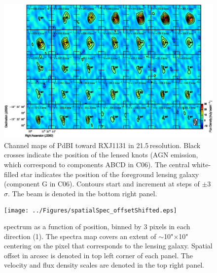 \documentclass[]{emulateapj}
\begin{document}
\begin{figure}[!htbp]
\centering
\includegraphics[width=1.0\textwidth]{../Figures/co_channel_maps.eps}
\caption{
Channel maps of PdBI \bco toward RXJ1131 in 21.5\,\kms resolution.
Black crosses indicate the position of the lensed knots (AGN emission,
which correspond to components ABCD in C06). The central white-filled
star indicates the position of the foreground lensing galaxy (component G
in C06). Contours start and increment at steps of
$\pm$3$\sigma$. The beam is denoted in the bottom right panel. \label{fig:chanmap}}
\end{figure}

\begin{figure}[!htbp]
\centering
\texttt{[image: ../Figures/spatialSpec\_offsetShifted.eps]}
\caption{
\bco spectrum as a function of position, binned by 3 pixels in each
direction (1).
The spectra map covers an extent of $\sim$10"$\times$10"
centering on the pixel that corresponds to the lensing galaxy.
Spatial offset in arcsec is denoted in top left corner of each panel.
The velocity and flux density scales are denoted in the top right panel.
\label{fig:spatialSpec}}
\end{figure}
\end{document}
